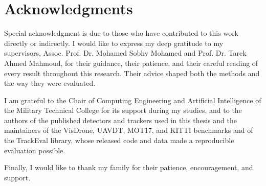 \chapter*{Acknowledgments}

Special acknowledgment is due to those who have contributed to this work directly or indirectly. I would like to express my deep gratitude to my supervisors, Assoc. Prof. Dr. Mohamed Sobhy Mohamed and Prof. Dr. Tarek Ahmed Mahmoud, for their guidance, their patience, and their careful reading of every result throughout this research. Their advice shaped both the methods and the way they were evaluated.

I am grateful to the Chair of Computing Engineering and Artificial Intelligence of the Military Technical College for its support during my studies, and to the authors of the published detectors and trackers used in this thesis and the maintainers of the VisDrone, UAVDT, MOT17, and KITTI benchmarks and of the TrackEval library, whose released code and data made a reproducible evaluation possible.

Finally, I would like to thank my family for their patience, encouragement, and support.
